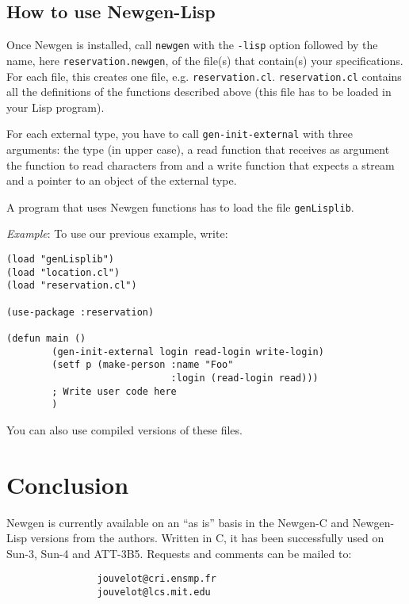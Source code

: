 \subsection{How to use Newgen-Lisp}

Once Newgen is installed, call {\tt newgen} with the {\tt -lisp} option
followed by the name, here {\tt reservation.newgen}, of the file(s) that
contain(s) your specifications.  For each file, this creates one file,
e.g. {\tt reser\-va\-tion.cl}. {\tt reser\-va\-tion.cl} contains all the
definitions of the functions described above (this file has to be loaded
in your Lisp program).

For each external type, you have to call {\tt gen-init-external} with
three arguments: the type (in upper case), a read function that receives
as argument the function to read characters from and a write function that
expects a stream and a pointer to an object of the external type.

A program that uses Newgen functions has to load the file {\tt genLisplib}.

{\em Example}: To use our previous example, write:
\begin{verbatim}
(load "genLisplib")
(load "location.cl")
(load "reservation.cl")

(use-package :reservation)

(defun main ()
        (gen-init-external login read-login write-login)
        (setf p (make-person :name "Foo"
                             :login (read-login read)))
        ; Write user code here
        )
\end{verbatim}

You can also use compiled versions of these files.

\section {Conclusion}

Newgen is currently available on an ``as is'' basis in the Newgen-C and
Newgen-Lisp versions from the authors. Written in C, it has been
successfully used on Sun-3, Sun-4 and ATT-3B5.  Requests and comments
can be mailed to:
\begin{verbatim}
                jouvelot@cri.ensmp.fr
                jouvelot@lcs.mit.edu
\end{verbatim}


